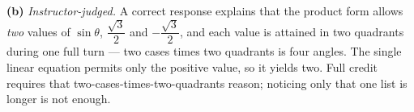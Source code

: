 \documentclass[12pt]{article}
\begin{document}
\textbf{(b)} \emph{Instructor-judged.} A correct response explains that the product form allows \emph{two} values of $\sin\theta$, $\dfrac{\sqrt{3}}{2}$ and $-\dfrac{\sqrt{3}}{2}$, and each value is attained in two quadrants during one full turn --- two cases times two quadrants is four angles. The single linear equation permits only the positive value, so it yields two. Full credit requires that two-cases-times-two-quadrants reason; noticing only that one list is longer is not enough.
\end{document}

